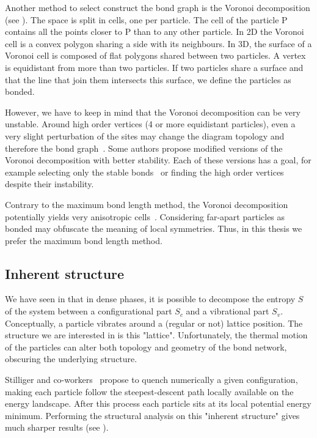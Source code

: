 Another method to select construct the bond graph is the Voronoi decomposition (see ). The space is split in cells, one per particle. The cell of the particle P contains all the points closer to P than to any other particle. In 2D the Voronoi cell is a convex polygon sharing a side with its neighbours. In 3D, the surface of a Voronoi cell is composed of flat polygons shared between two particles. A vertex is equidistant from more than two particles. If two particles share a surface and that the line that join them intersects this surface, we define the particles as bonded.

However, we have to keep in mind that the Voronoi decomposition can be very unstable. Around high order vertices (4 or more equidistant particles), even a very slight perturbation of the sites may change the diagram topology and therefore the bond graph~\citep{weller1997stability, ReintenWolde1996, Williams2007}. Some authors propose modified versions of the Voronoi decomposition with better stability. Each of these versions has a goal, for example selecting only the stable bonds~\citep{weller1997stability} or finding the high order vertices~\citep{Williams2007, rycroft2007multiscale} despite their instability.

Contrary to the maximum bond length method, the Voronoi decomposition potentially yields very anisotropic cells~\citep{Schroder-Turk2010}. Considering far-apart particles as bonded may obfuscate the meaning of local symmetries. Thus, in this thesis we prefer the maximum bond length method.

\subsection{Inherent structure}

We have seen in  that in dense phases, it is possible to decompose the entropy $S$ of the system between a configurational part $S_c$ and a vibrational part $S_v$. Conceptually, a particle vibrates around a (regular or not) lattice position. The structure we are interested in is this "lattice". Unfortunately, the thermal motion of the particles can alter both topology and geometry of the bond network, obscuring the underlying structure. 

Stilliger and co-workers~\citep{Stillinger1982, Stillinger1984} propose to quench numerically a given configuration, making each particle follow the steepest-descent path locally available on the energy landscape. After this process each particle sits at its local potential energy minimum. Performing the structural analysis on this "inherent structure" gives much sharper results (see ).

